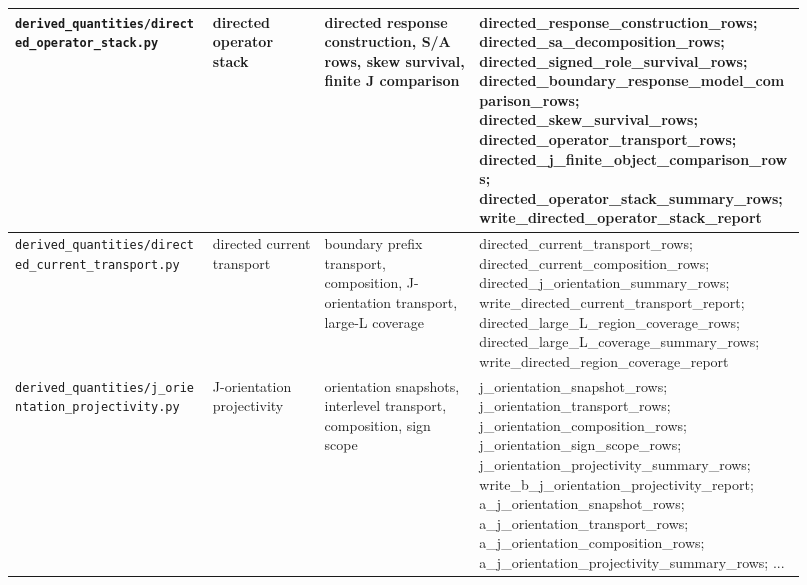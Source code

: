 \documentclass[11pt]{article}
\theoremstyle{remark}
\newcommand{\code}[1]{\texttt{#1}}
\numberwithin{equation}{section}
\begin{document}
\begin{longtable}{>{\raggedright\arraybackslash}p{0.23\linewidth}>{\raggedright\arraybackslash}p{0.13\linewidth}>{\raggedright\arraybackslash}p{0.18\linewidth}>{\raggedright\arraybackslash}p{0.38\linewidth}}
\hline
\code{derived\_\allowbreak{}quantities/directed\_\allowbreak{}operator\_\allowbreak{}stack.py} & directed operator stack & directed response construction, S/A rows, skew survival, finite J comparison & directed\_\allowbreak{}response\_\allowbreak{}construction\_\allowbreak{}rows; directed\_\allowbreak{}sa\_\allowbreak{}decomposition\_\allowbreak{}rows; directed\_\allowbreak{}signed\_\allowbreak{}role\_\allowbreak{}survival\_\allowbreak{}rows; directed\_\allowbreak{}boundary\_\allowbreak{}response\_\allowbreak{}model\_\allowbreak{}comparison\_\allowbreak{}rows; directed\_\allowbreak{}skew\_\allowbreak{}survival\_\allowbreak{}rows; directed\_\allowbreak{}operator\_\allowbreak{}transport\_\allowbreak{}rows; directed\_\allowbreak{}j\_\allowbreak{}finite\_\allowbreak{}object\_\allowbreak{}comparison\_\allowbreak{}rows; directed\_\allowbreak{}operator\_\allowbreak{}stack\_\allowbreak{}summary\_\allowbreak{}rows; write\_\allowbreak{}directed\_\allowbreak{}operator\_\allowbreak{}stack\_\allowbreak{}report\\
\hline
\code{derived\_\allowbreak{}quantities/directed\_\allowbreak{}current\_\allowbreak{}transport.py} & directed current transport & boundary prefix transport, composition, J-orientation transport, large-L coverage & directed\_\allowbreak{}current\_\allowbreak{}transport\_\allowbreak{}rows; directed\_\allowbreak{}current\_\allowbreak{}composition\_\allowbreak{}rows; directed\_\allowbreak{}j\_\allowbreak{}orientation\_\allowbreak{}summary\_\allowbreak{}rows; write\_\allowbreak{}directed\_\allowbreak{}current\_\allowbreak{}transport\_\allowbreak{}report; directed\_\allowbreak{}large\_\allowbreak{}L\_\allowbreak{}region\_\allowbreak{}coverage\_\allowbreak{}rows; directed\_\allowbreak{}large\_\allowbreak{}L\_\allowbreak{}coverage\_\allowbreak{}summary\_\allowbreak{}rows; write\_\allowbreak{}directed\_\allowbreak{}region\_\allowbreak{}coverage\_\allowbreak{}report\\
\hline
\code{derived\_\allowbreak{}quantities/j\_\allowbreak{}orientation\_\allowbreak{}projectivity.py} & J-orientation projectivity & orientation snapshots, interlevel transport, composition, sign scope & j\_\allowbreak{}orientation\_\allowbreak{}snapshot\_\allowbreak{}rows; j\_\allowbreak{}orientation\_\allowbreak{}transport\_\allowbreak{}rows; j\_\allowbreak{}orientation\_\allowbreak{}composition\_\allowbreak{}rows; j\_\allowbreak{}orientation\_\allowbreak{}sign\_\allowbreak{}scope\_\allowbreak{}rows; j\_\allowbreak{}orientation\_\allowbreak{}projectivity\_\allowbreak{}summary\_\allowbreak{}rows; write\_\allowbreak{}b\_\allowbreak{}j\_\allowbreak{}orientation\_\allowbreak{}projectivity\_\allowbreak{}report; a\_\allowbreak{}j\_\allowbreak{}orientation\_\allowbreak{}snapshot\_\allowbreak{}rows; a\_\allowbreak{}j\_\allowbreak{}orientation\_\allowbreak{}transport\_\allowbreak{}rows; a\_\allowbreak{}j\_\allowbreak{}orientation\_\allowbreak{}composition\_\allowbreak{}rows; a\_\allowbreak{}j\_\allowbreak{}orientation\_\allowbreak{}projectivity\_\allowbreak{}summary\_\allowbreak{}rows; ...\\

\end{longtable}
\end{document}
